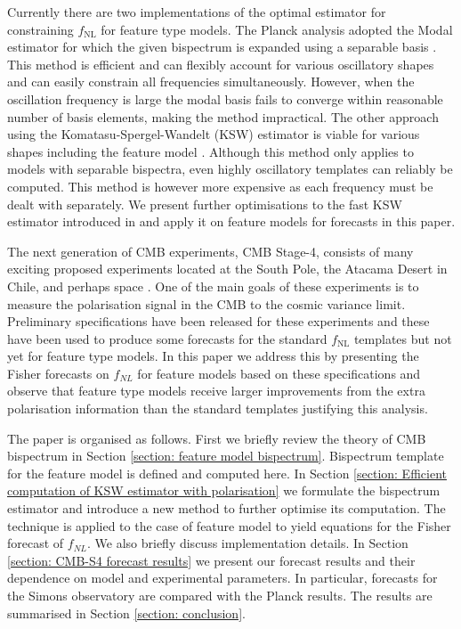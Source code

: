 Currently there are two implementations of the optimal estimator for constraining $f_\text{NL}$ for feature type models. The Planck analysis adopted the Modal estimator for which the given bispectrum is expanded using a separable basis \cite{Fergusson2012,Fergusson2014}. This method is efficient and can flexibly account for various oscillatory shapes and can easily constrain all frequencies simultaneously. However, when the oscillation frequency is large the modal basis fails to converge within reasonable number of basis elements, making the method impractical. The other approach using the Komatasu-Spergel-Wandelt (KSW) estimator is viable for various shapes including the feature model \cite{Komatsu2005,Munchmeyer2014}. Although this method only applies to models with separable bispectra, even highly oscillatory templates can reliably be computed.  This method is however more expensive as each frequency must be dealt with separately. We present further optimisations to the fast KSW estimator introduced in \cite{Yadav2007} and apply it on feature models for forecasts in this paper.

The next generation of CMB experiments, CMB Stage-4, consists of many exciting proposed experiments located at the South Pole, the Atacama Desert in Chile, and perhaps space \cite{Abazajian2016,TheSimonsObservatoryCollaboration2018,TheCOrEcollaboration2015}. One of the main goals of these experiments is to measure the polarisation signal in the CMB to the cosmic variance limit. Preliminary specifications have been released for these experiments \cite{Abazajian2016,TheSimonsObservatoryCollaboration2018} and these have been used to produce some forecasts for the standard $f_\text{NL}$ templates but not yet for feature type models. In this paper we address this by presenting the Fisher forecasts on $f_{NL}$ for feature models based on these specifications and observe that feature type models receive larger improvements from the extra polarisation information than the standard templates justifying this analysis.

The paper is organised as follows. First we briefly review the theory of CMB bispectrum in Section \ref{section: feature model bispectrum}. Bispectrum template for the feature model is defined and computed here. In Section \ref{section: Efficient computation of KSW estimator with polarisation} we formulate the bispectrum estimator and introduce a new method to further optimise its computation. The technique is applied to the case of feature model to yield equations for the Fisher forecast of $f_{NL}$. We also briefly discuss implementation details. In Section \ref{section: CMB-S4 forecast results} we present our forecast results and their dependence on model and experimental parameters. In particular, forecasts for the Simons observatory are compared with the Planck results. The results are summarised in Section \ref{section: conclusion}.


